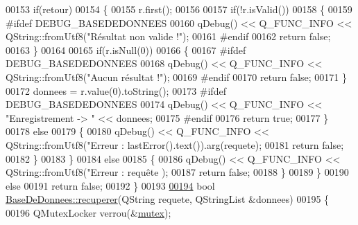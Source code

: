 \begin{DoxyCode}
{{{{{00153             \textcolor{keywordflow}{if}(retour)
00154             \{
00155                 r.first();
00156 
00157                 \textcolor{keywordflow}{if}(!r.isValid())
00158                 \{
00159 \textcolor{preprocessor}{                    #ifdef DEBUG\_BASEDEDONNEES}
00160                     qDebug() << Q\_FUNC\_INFO << QString::fromUtf8(\textcolor{stringliteral}{"Résultat non valide !"});
00161 \textcolor{preprocessor}{                    #endif}
00162                     \textcolor{keywordflow}{return} \textcolor{keyword}{false};
00163                 \}
00164 
00165                 \textcolor{keywordflow}{if}(r.isNull(0))
00166                 \{
00167 \textcolor{preprocessor}{                    #ifdef DEBUG\_BASEDEDONNEES}
00168                     qDebug() << Q\_FUNC\_INFO << QString::fromUtf8(\textcolor{stringliteral}{"Aucun résultat !"});
00169 \textcolor{preprocessor}{                    #endif}
00170                     \textcolor{keywordflow}{return} \textcolor{keyword}{false};
00171                 \}
00172                 donnees = r.value(0).toString();
00173 \textcolor{preprocessor}{                #ifdef DEBUG\_BASEDEDONNEES}
00174                 qDebug() << Q\_FUNC\_INFO << \textcolor{stringliteral}{"Enregistrement -> "} << donnees;
00175 \textcolor{preprocessor}{                #endif}
00176                 \textcolor{keywordflow}{return} \textcolor{keyword}{true};
00177             \}
00178             \textcolor{keywordflow}{else}
00179             \{
00180                 qDebug() << Q\_FUNC\_INFO << QString::fromUtf8(\textcolor{stringliteral}{"Erreur : %
      lastError().text()).arg(requete);
00181                 \textcolor{keywordflow}{return} \textcolor{keyword}{false};
00182             \}
00183         \}
00184         \textcolor{keywordflow}{else}
00185         \{
00186             qDebug() << Q\_FUNC\_INFO << QString::fromUtf8(\textcolor{stringliteral}{"Erreur : requête %
      );
00187             \textcolor{keywordflow}{return} \textcolor{keyword}{false};
00188         \}
00189     \}
00190     \textcolor{keywordflow}{else}
00191         \textcolor{keywordflow}{return} \textcolor{keyword}{false};
00192 \}
00193 
\hyperlink{class_base_de_donnees_a2a5c461fa11d404810ae3ebe035d5190}{00194} \textcolor{keywordtype}{bool} \hyperlink{class_base_de_donnees_a77539baad389f5acf754cd2cd452403e}{BaseDeDonnees::recuperer}(QString requete, QStringList &donnees)
00195 \{
00196     QMutexLocker verrou(&\hyperlink{class_base_de_donnees_aa1b4696fac87a740f914aa73739086f2}{mutex});
}}}}}}}
\end{DoxyCode}
